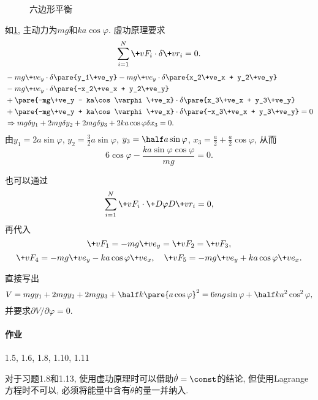 \documentclass{ctexart}
\begin{document}
\begin{figure}[ht]
    \centering
    \caption{六边形平衡}
    \label{fig:六边形平衡2}
\end{figure}
\begin{sample}
    \begin{ex}
        如\cref{fig:六边形平衡2}, 主动力为$mg$和$ka\cos\varphi$. 虚功原理要求
        \[ \sum_{i=1}^N \+vF_i\cdot\delta\+vr_i = 0. \]
        \begin{align*}
            &-mg\+ve_y\cdot\delta\pare{y_1\+ve_y} - mg\+ve_y\cdot\delta\pare{x_2\+ve_x + y_2\+ve_y}\\
            &-mg\+ve_y\cdot\delta\pare{-x_2\+ve_x + y_2\+ve_y}\\
            &+\pare{-mg\+ve_y - ka\cos\varphi \+ve_x}\cdot\delta\pare{x_3\+ve_x + y_3\+ve_y} \\
            &+\pare{-mg\+ve_y + ka\cos\varphi \+ve_x}\cdot\delta\pare{-x_3\+ve_x + y_3\+ve_y} = 0 \\
            &\Rightarrow mg\delta y_1 + 2mg\delta y_2 + 2mg\delta y_3 + 2ka\cos\varphi\delta x_3 = 0.
        \end{align*}
        由$y_1=2a\sin\varphi$, $y_2 = \frac{3}{2}a\sin\varphi$, $y_3 =\half a\sin\varphi$, $x_3 = \frac{a}{2} + \frac{a}{2}\cos\varphi$, 从而
        \[ 6\cos\varphi - \frac{ka\sin\varphi\cos\varphi}{mg} = 0. \]
    \end{ex}
    \begin{ex}
        也可以通过
        \[ \sum_{i=1}^N \+vF_i \cdot \+D{\varphi}D{\+vr_i} = 0, \]
        再代入
        \[ \+vF_1 = -mg\+ve_y = \+vF_2 = \+vF_3, \]
        \[ \+vF_4 = -mg\+ve_y - ka\cos\varphi\+ve_x,\quad \+vF_5 = -mg\+ve_y + ka\cos\varphi\+ve_x. \]
    \end{ex}
    \begin{ex}
        直接写出
        \[ V = mgy_1 + 2mgy_2 + 2mgy_3 + \half k\pare{a\cos\varphi}^2 = 6mg\sin\varphi + \half ka^2\cos^2\varphi, \]
        并要求$\partial V/\partial \varphi = 0$.
    \end{ex}
\end{sample}
\paragraph{作业} %
\label{par:作业}

1.5, 1.6, 1.8, 1.10, 1.11


\begin{remark}
    对于习题1.8和1.13, 使用虚功原理时可以借助$\dot{\theta}=\const$的结论, 但使用Lagrange方程时不可以, 必须将能量中含有$\dot{\theta}$的量一并纳入.
\end{remark}
\end{document}
